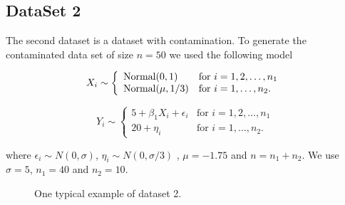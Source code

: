 

\subsection{DataSet 2}


The second dataset is a dataset with contamination. To generate the contaminated data set of size $n = 50$ we used the following model

\[ X_i \sim \left\{ \begin{array}{ll}
         \hbox{Normal} (0, 1) & \mbox{for $i = 1,2, \dots, n_1$}\\
        \hbox{Normal} (\mu, 1/3) & \mbox{for $i = 1,  \dots, n_2$}.\end{array} \right. \]

\[ Y_i \sim \left\{ \begin{array}{ll}
         5 + \beta_1 X_i + \epsilon_i  & \mbox{for $i = 1,2, \dots, n_1$}\\
         20 + \eta_i & \mbox{for $i = 1, \dots, n_2$}.\end{array} \right. \]
         
where  $\epsilon_i \sim N(0, \sigma)$, $\eta_i \sim N(0, \sigma/3)$ , $\mu = -1.75$ and $n = n_1 + n_2$.  We use $\sigma = 5$, $n_1 = 40$ and $n_2 = 10$. \\      

\begin{figure}[hbtp]
   \centering
       \caption{One typical example of dataset 2.}
       \label{data2}
\end{figure}
        

